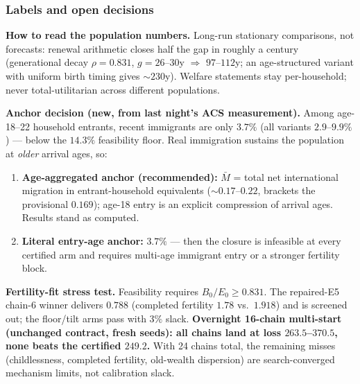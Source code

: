 \documentclass[10pt]{beamer}
\begin{document}
\begin{frame}
\frametitle{Labels and open decisions}
\textbf{How to read the population numbers.} Long-run stationary comparisons,
not forecasts: renewal arithmetic closes half the gap in roughly a century
(generational decay $\rho=0.831$, $g=26$--$30$y $\Rightarrow$ $97$--$112$y;
an age-structured variant with uniform birth timing gives $\sim 230$y).
Welfare statements stay per-household; never total-utilitarian across
different populations.

\medskip
\textbf{Anchor decision (new, from last night's ACS measurement).}
Among age-18--22 household entrants, recent immigrants are only $3.7\%$
(all variants $2.9$--$9.9\%$) --- below the $14.3\%$ feasibility floor.
Real immigration sustains the population at \emph{older} arrival ages, so:
\begin{enumerate}
  \item \textbf{Age-aggregated anchor (recommended):} $\bar M$ = total net
  international migration in entrant-household equivalents
  ($\sim 0.17$--$0.22$, brackets the provisional $0.169$); age-18 entry is an
  explicit compression of arrival ages. Results stand as computed.
  \item \textbf{Literal entry-age anchor:} $3.7\%$ --- then the closure is
  infeasible at every certified arm and requires multi-age immigrant entry
  or a stronger fertility block.
\end{enumerate}

\medskip
\textbf{Fertility-fit stress test.} Feasibility requires
$B_0/E_0\ge 0.831$. The repaired-E5 chain-6 winner delivers $0.788$
(completed fertility $1.78$ vs.\ $1.918$) and is screened out; the floor/tilt
arms pass with $3\%$ slack. \textbf{Overnight 16-chain multi-start (unchanged
contract, fresh seeds): all chains land at loss $263.5$--$370.5$, none beats
the certified $249.2$.} With 24 chains total, the remaining misses
(childlessness, completed fertility, old-wealth dispersion) are search-converged
mechanism limits, not calibration slack.
\end{frame}
\end{document}
